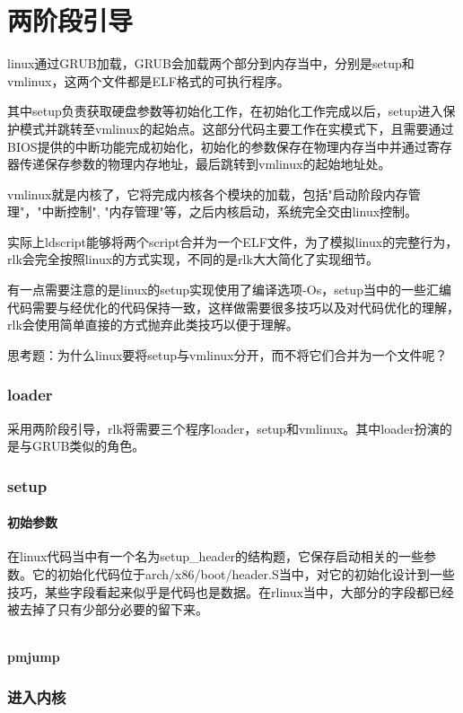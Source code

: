 \chapter{两阶段引导}
linux通过GRUB加载，GRUB会加载两个部分到内存当中，分别是setup和vmlinux，这两个文件都是ELF格式的可执行程序。

其中setup负责获取硬盘参数等初始化工作，在初始化工作完成以后，setup进入保护模式并跳转至vmlinux的起始点。这部分代码主要工作在实模式下，且需要通过BIOS提供的中断功能完成初始化，初始化的参数保存在物理内存当中并通过寄存器传递保存参数的物理内存地址，最后跳转到vmlinux的起始地址处。

vmlinux就是内核了，它将完成内核各个模块的加载，包括"启动阶段内存管理"，"中断控制", "内存管理"等，之后内核启动，系统完全交由linux控制。

实际上ldscript能够将两个script合并为一个ELF文件，为了模拟linux的完整行为，rlk会完全按照linux的方式实现，不同的是rlk大大简化了实现细节。

有一点需要注意的是linux的setup实现使用了编译选项-Os，setup当中的一些汇编代码需要与经优化的代码保持一致，这样做需要很多技巧以及对代码优化的理解，rlk会使用简单直接的方式抛弃此类技巧以便于理解。

思考题：为什么linux要将setup与vmlinux分开，而不将它们合并为一个文件呢？

\subsection{loader}
采用两阶段引导，rlk将需要三个程序loader，setup和vmlinux。其中loader扮演的是与GRUB类似的角色。

\subsection{setup}
\subsubsection{初始参数}
在linux代码当中有一个名为setup\_header的结构题，它保存启动相关的一些参数。它的初始化代码位于arch/x86/boot/header.S当中，对它的初始化设计到一些技巧，某些字段看起来似乎是代码也是数据。在rlinux当中，大部分的字段都已经被去掉了只有少部分必要的留下来。
\begin{lstlisting}
\end{lstlisting}

\subsubsection{pmjump}
\subsection{进入内核}


